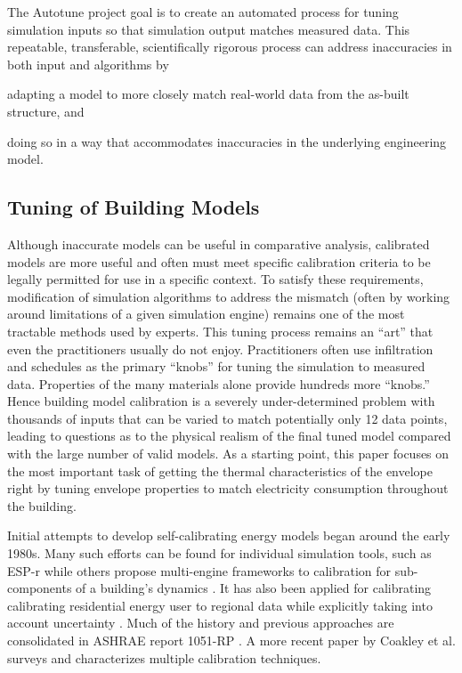 \documentclass[preprint, review, 12pt]{elsarticle}
\begin{document}
The Autotune project \cite{cit:new2012} goal is to create an automated process for tuning simulation inputs so that simulation output matches measured data. This repeatable, transferable, scientifically rigorous process can address inaccuracies in both input and algorithms by 
\begin{inparaenum}[(1)]
\item adapting a model to more closely match real-world data from the as-built structure,  and 
\item doing so in a way that accommodates inaccuracies in the underlying engineering
model.
\end{inparaenum}

\subsection{Tuning of Building Models}
Although inaccurate models can be useful in comparative analysis, calibrated models are more useful and often must meet specific calibration criteria to be legally permitted for use in a specific context. To satisfy these requirements, modification of simulation algorithms to address the mismatch (often by working around limitations of a given simulation engine) remains one of the most tractable methods used by experts. This tuning process remains an ``art'' that even the practitioners usually do not enjoy. Practitioners often use infiltration and schedules as the primary ``knobs'' for tuning the simulation to measured data. Properties of the many materials alone provide hundreds more ``knobs.'' Hence building model calibration is a severely under-determined problem with thousands of inputs that can be varied to match potentially only 12 data points, leading to questions as to the physical realism of the final tuned model compared with the large number of valid models. As a starting point, this paper focuses on the most important task of getting the thermal characteristics of the envelope right by tuning envelope properties to match electricity consumption throughout the building.

Initial attempts to develop self-calibrating energy models began around the early 1980s. Many such efforts can be found for individual simulation tools, such as ESP-r \cite{Strachan2008601} while others propose multi-engine frameworks to calibration for sub-components of a building's dynamics \cite{Murphy2013484}. It has also been applied for calibrating calibrating residential energy user to regional data while explicitly taking into account uncertainty \cite{vanRuijven2010269}. Much of the history and previous approaches are consolidated in ASHRAE report 1051-RP \cite{cit:reddy2006}. A more recent paper by Coakley et al. \cite{vanRuijven2010269} surveys and characterizes multiple calibration techniques.
\end{document}
